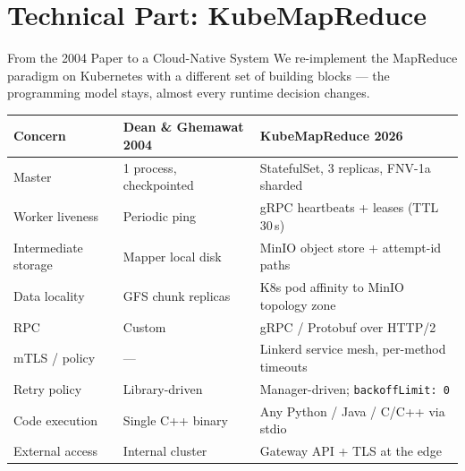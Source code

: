 \documentclass[11pt]{beamer}
\begin{document}
\section{Technical Part: KubeMapReduce}

\begin{frame}{From the 2004 Paper to a Cloud-Native System}
We re-implement the MapReduce paradigm on \alert{Kubernetes} with a different set
of building blocks --- the programming model stays, almost every runtime
decision changes.

\vspace{0.3em}
\scriptsize
\begin{table}
\centering
\begin{tabular}{lll}
\toprule
Concern              & Dean \& Ghemawat 2004     & \textbf{KubeMapReduce 2026} \\
\midrule
Master               & 1 process, checkpointed   & \alert{StatefulSet}, 3 replicas, FNV-1a sharded \\
Worker liveness      & Periodic ping             & \alert{gRPC heartbeats + leases} (TTL 30\,s) \\
Intermediate storage & Mapper local disk         & \alert{MinIO} object store + attempt-id paths \\
Data locality        & GFS chunk replicas        & \alert{K8s pod affinity} to MinIO topology zone \\
RPC                  & Custom                    & \alert{gRPC / Protobuf} over HTTP/2 \\
mTLS / policy        & ---                       & \alert{Linkerd} service mesh, per-method timeouts \\
Retry policy         & Library-driven            & \alert{Manager-driven}; \texttt{backoffLimit:\,0} \\
Code execution       & Single C++ binary         & Any \alert{Python / Java / C/C++} via stdio \\
External access      & Internal cluster          & \alert{Gateway API} + TLS at the edge \\
\bottomrule
\end{tabular}
\end{table}
\end{frame}
\end{document}
